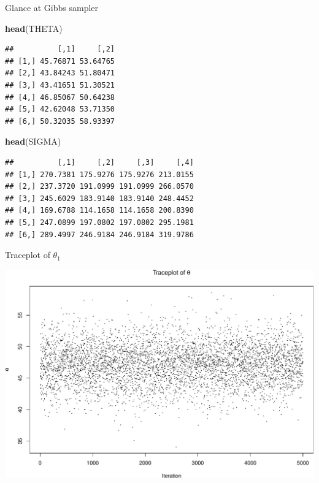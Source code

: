\documentclass[
  ignorenonframetext,
]{beamer}
\newenvironment{Shaded}{\begin{snugshade}}{\end{snugshade}}
\newcommand{\KeywordTok}[1]{\textcolor[rgb]{0.13,0.29,0.53}{\textbf{#1}}}
\newcommand{\NormalTok}[1]{#1}
\begin{document}
\begin{frame}[fragile]{Glance at Gibbs sampler}
\protect\hypertarget{glance-at-gibbs-sampler}{}

\begin{Shaded}
\begin{Highlighting}[]
\KeywordTok{head}\NormalTok{(THETA)}
\end{Highlighting}
\end{Shaded}

\begin{verbatim}
##          [,1]     [,2]
## [1,] 45.76871 53.64765
## [2,] 43.84243 51.80471
## [3,] 43.41651 51.30521
## [4,] 46.85067 50.64238
## [5,] 42.62048 53.71350
## [6,] 50.32035 58.93397
\end{verbatim}

\begin{Shaded}
\begin{Highlighting}[]
\KeywordTok{head}\NormalTok{(SIGMA)}
\end{Highlighting}
\end{Shaded}

\begin{verbatim}
##          [,1]     [,2]     [,3]     [,4]
## [1,] 270.7381 175.9276 175.9276 213.0155
## [2,] 237.3720 191.0999 191.0999 266.0570
## [3,] 245.6029 183.9140 183.9140 248.4452
## [4,] 169.6788 114.1658 114.1658 200.8390
## [5,] 247.0899 197.0802 197.0802 295.1981
## [6,] 289.4997 246.9184 246.9184 319.9786
\end{verbatim}

\end{frame}

\begin{frame}{Traceplot of \(\theta_1\)}
\protect\hypertarget{traceplot-of-theta_1}{}

\includegraphics{08-multivariate-norm_files/figure-beamer/unnamed-chunk-12-1.pdf}

\end{frame}
\end{document}

